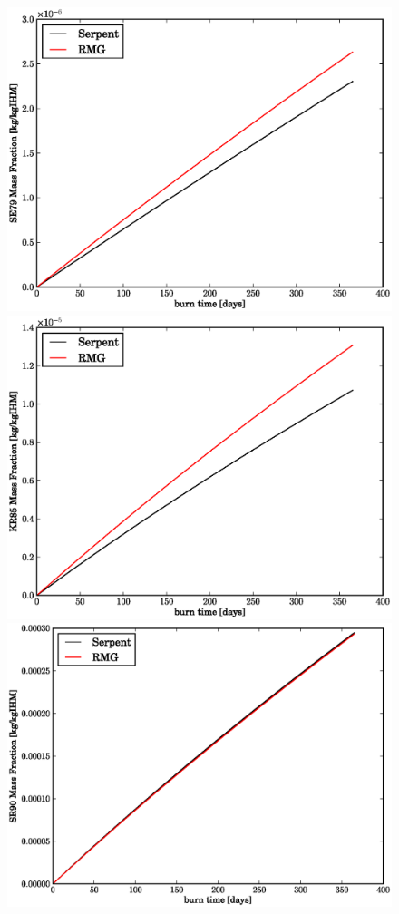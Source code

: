 \begin{figure}[htbp]
\begin{center}
\includegraphics[scale=0.3]{multigroup_method/figs/benchmark/SE79_Mass_Fraction_.eps}
\includegraphics[scale=0.3]{multigroup_method/figs/benchmark/KR85_Mass_Fraction_.eps}
\includegraphics[scale=0.3]{multigroup_method/figs/benchmark/SR90_Mass_Fraction_.eps}

\end{center}
\end{figure}
